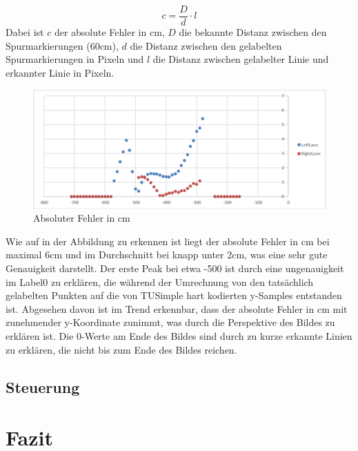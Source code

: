 \documentclass{article}
\begin{document}
            \begin{equation}
                 c = \frac{D}{d} \cdot l
            \end{equation}
            Dabei ist $c$ der absolute Fehler in cm, $D$ die bekannte Distanz zwischen den Spurmarkierungen (60cm), $d$ die Distanz zwischen den gelabelten Spurmarkierungen in Pixeln und $l$ die Distanz zwischen gelabelter Linie und erkannter Linie in Pixeln.

            \begin{figure}[h!]
                \includegraphics[width=\linewidth]{Auswertung_6e7e3724-test_103_absolut.png}
                \caption{Absoluter Fehler in cm}
                \label{fig:AbsoluterFehlerCm}
            \end{figure}

            Wie auf in der Abbildung zu erkennen ist liegt der absolute Fehler in cm bei maximal 6cm und im Durchschnitt bei knapp unter 2cm, was eine sehr gute Genauigkeit darstellt.
            Der erste Peak bei etwa -500 ist durch eine ungenauigkeit im Label0 zu erklären, die während der Umrechnung von den tatsächlich gelabelten Punkten auf die von TUSimple hart kodierten y-Samples entstanden ist. 
            Abgesehen davon ist im Trend erkennbar, dass der absolute Fehler in cm mit zunehmender y-Koordinate zunimmt, was durch die Perspektive des Bildes zu erklären ist.
            Die 0-Werte am Ende des Bildes sind durch zu kurze erkannte Linien zu erklären, die nicht bis zum Ende des Bildes reichen.


        \subsection{Steuerung}
    \section{Fazit}
\end{document}
